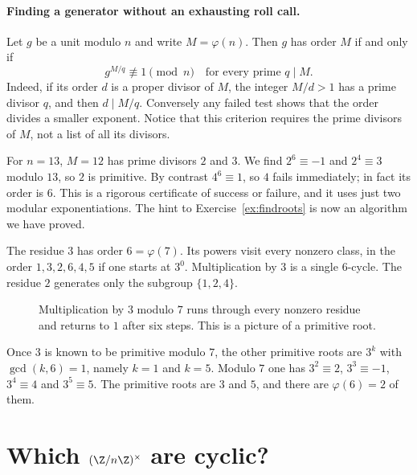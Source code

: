 \paragraph{Finding a generator without an exhausting roll call.}
Let $g$ be a unit modulo $n$ and write $M=\varphi(n)$. Then $g$ has order
$M$ if and only if
\[
 g^{M/q}\not\equiv1\pmod n
 \quad\text{for every prime }q\mid M.
\]
Indeed, if its order $d$ is a proper divisor of $M$, the integer $M/d>1$
has a prime divisor $q$, and then $d\mid M/q$. Conversely any failed test
shows that the order divides a smaller exponent. Notice that this criterion
requires the prime divisors of $M$, not a list of all its divisors.

For $n=13$, $M=12$ has prime divisors $2$ and $3$. We find
$2^6\equiv-1$ and $2^4\equiv3$ modulo $13$, so $2$ is primitive.
By contrast $4^6\equiv1$, so $4$ fails immediately; in fact its order is $6$.
This is a rigorous certificate of success or failure, and it uses just two
modular exponentiations. The hint to Exercise~\ref{ex:findroots} is now an
algorithm we have proved.

\begin{examplex}
The residue $3$ has order $6=\varphi(7)$. Its powers visit every nonzero class, in the order $1,3,2,6,4,5$ if one starts at $3^0$. Multiplication by $3$ is a single $6$-cycle. The residue $2$ generates only the subgroup $\{1,2,4\}$.
\end{examplex}

\begin{figure}[ht]
\centering
{}
\caption{Multiplication by $3$ modulo $7$ runs through every nonzero residue and returns to $1$ after six steps. This is a picture of a primitive root.}
\label{fig:t1-cycle}
\end{figure}

\begin{examplex}
Once $3$ is known to be primitive modulo $7$, the other primitive roots are $3^k$ with $\gcd(k,6)=1$, namely $k=1$ and $k=5$. Modulo $7$ one has $3^2\equiv 2$, $3^3\equiv -1$, $3^4\equiv 4$ and $3^5\equiv 5$. The primitive roots are $3$ and $5$, and there are $\varphi(6)=2$ of them.
\end{examplex}

\section{Which \texorpdfstring{$(\Z/n\Z)^\times$}{(Z/nZ)*} are cyclic?}

